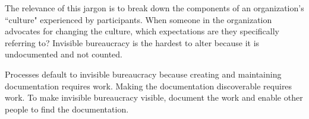 The relevance of this jargon is to break down the components of an organization's ``culture" experienced by participants.
When someone in the organization advocates for changing the culture, which expectations are they specifically referring to? Invisible bureaucracy is the hardest to alter because it is undocumented and not counted.

Processes default to invisible bureaucracy because creating and maintaining documentation requires work. Making the documentation discoverable requires work.
To make invisible bureaucracy visible, document the work and enable other people to find the documentation.
